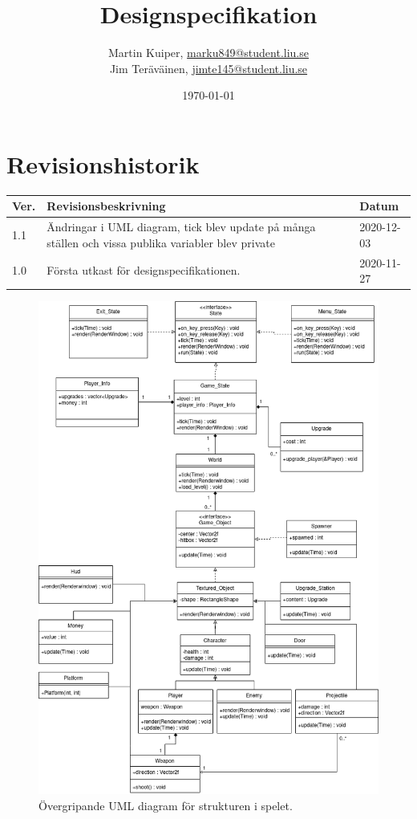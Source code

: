 \documentclass{TDP005mall}
\author{Martin Kuiper, \url{marku849@student.liu.se}\\
  Jim Teräväinen, \url{jimte145@student.liu.se}}
\title{Designspecifikation}
\date{\today}
\begin{document}
\projectpage
\section{Revisionshistorik}
\begin{table}[!h]
\begin{tabularx}{\linewidth}{|l|X|l|}
\hline
Ver. & Revisionsbeskrivning & Datum \\\hline
1.1 & Ändringar i UML diagram, tick blev update på många ställen och vissa publika variabler blev private & 2020-12-03 \\\hline
1.0 & Första utkast för designspecifikationen. & 2020-11-27 \\\hline
\end{tabularx}
\end{table}


\begin{figure}[H]
         \begin{center}
             \includegraphics[width=15cm]{Graphic/overview.png}
             \caption{\label{fig:1} Övergripande UML diagram för strukturen i spelet.}
         \end{center}
\end{figure}
\end{document}
